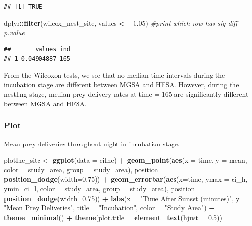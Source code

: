 \documentclass[]{article}
\newenvironment{Shaded}{\begin{snugshade}}{\end{snugshade}}
\newcommand{\CommentTok}[1]{\textcolor[rgb]{0.56,0.35,0.01}{\textit{#1}}}
\newcommand{\DataTypeTok}[1]{\textcolor[rgb]{0.13,0.29,0.53}{#1}}
\newcommand{\FloatTok}[1]{\textcolor[rgb]{0.00,0.00,0.81}{#1}}
\newcommand{\KeywordTok}[1]{\textcolor[rgb]{0.13,0.29,0.53}{\textbf{#1}}}
\newcommand{\NormalTok}[1]{#1}
\newcommand{\OperatorTok}[1]{\textcolor[rgb]{0.81,0.36,0.00}{\textbf{#1}}}
\newcommand{\StringTok}[1]{\textcolor[rgb]{0.31,0.60,0.02}{#1}}
\begin{document}
\begin{verbatim}
## [1] TRUE
\end{verbatim}

\begin{Shaded}
\begin{Highlighting}[]
\NormalTok{dplyr}\OperatorTok{::}\KeywordTok{filter}\NormalTok{(wilcox_nest_site, values }\OperatorTok{<=}\StringTok{ }\FloatTok{0.05}\NormalTok{) }\CommentTok{#print which row has sig diff p.value}
\end{Highlighting}
\end{Shaded}

\begin{verbatim}
##       values ind
## 1 0.04904887 165
\end{verbatim}

From the Wilcoxon tests, we see that no median time intervals during the
incubation stage are different between MGSA and HFSA. However, during
the nestling stage, median prey delivery rates at time = 165 are
significantly different between MGSA and HFSA.

\hypertarget{plot-1}{%
\subsubsection{Plot}\label{plot-1}}

Mean prey deliveries throughout night in incubation stage:

\begin{Shaded}
\begin{Highlighting}[]
\NormalTok{plotInc_site <-}\StringTok{ }\KeywordTok{ggplot}\NormalTok{(}\DataTypeTok{data =}\NormalTok{ ciInc) }\OperatorTok{+}
\StringTok{  }\KeywordTok{geom_point}\NormalTok{(}\KeywordTok{aes}\NormalTok{(}\DataTypeTok{x =}\NormalTok{ time, }\DataTypeTok{y =}\NormalTok{ mean, }\DataTypeTok{color =}\NormalTok{ study_area, }\DataTypeTok{group =}\NormalTok{ study_area),}
             \DataTypeTok{position =} \KeywordTok{position_dodge}\NormalTok{(}\DataTypeTok{width=}\FloatTok{0.75}\NormalTok{)) }\OperatorTok{+}
\StringTok{  }\KeywordTok{geom_errorbar}\NormalTok{(}\KeywordTok{aes}\NormalTok{(}\DataTypeTok{x=}\NormalTok{time, }\DataTypeTok{ymax =}\NormalTok{ ci_h, }\DataTypeTok{ymin=}\NormalTok{ci_l, }\DataTypeTok{color =}\NormalTok{ study_area, }
                    \DataTypeTok{group =}\NormalTok{ study_area),}
                \DataTypeTok{position =} \KeywordTok{position_dodge}\NormalTok{(}\DataTypeTok{width=}\FloatTok{0.75}\NormalTok{)) }\OperatorTok{+}
\StringTok{  }\KeywordTok{labs}\NormalTok{(}\DataTypeTok{x =} \StringTok{"Time After Sunset (minutes)"}\NormalTok{, }\DataTypeTok{y =} \StringTok{"Mean Prey Deliveries"}\NormalTok{, }
       \DataTypeTok{title =} \StringTok{"Incubation"}\NormalTok{, }\DataTypeTok{color =} \StringTok{"Study Area"}\NormalTok{) }\OperatorTok{+}
\StringTok{  }\KeywordTok{theme_minimal}\NormalTok{() }\OperatorTok{+}
\StringTok{  }\KeywordTok{theme}\NormalTok{(}\DataTypeTok{plot.title =} \KeywordTok{element_text}\NormalTok{(}\DataTypeTok{hjust =} \FloatTok{0.5}\NormalTok{))}
\end{Highlighting}
\end{Shaded}
\end{document}
